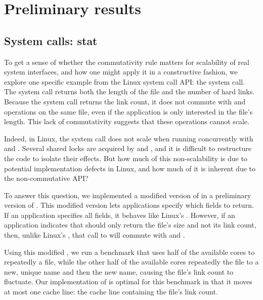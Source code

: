 \section{Preliminary results}
\label{s:prelim}



\subsection{System calls: stat}


To get a sense of whether the commutativity rule matters for scalability
of real system interfaces, and how one might apply it in a constructive
fashion, we explore one specific example from the Linux system call API:
the  system call.  The  system call returns both the
length of the file and the number of hard links.  Because the 
system call returns the link count, it does not commute with
 and  operations on the same file, even if
the application is only interested in the file's length. This lack of
commutativity suggests that these operations cannot scale.

Indeed, in Linux, the  system call does not scale when running
concurrently with  and .
Several shared locks are acquired by  and , and
it is difficult to restructure the code to isolate their effects.  But
how much of this non-scalability is due to potential implementation
defects in Linux, and how much of it is inherent due to the non-commutative
API?

To answer this question, we implemented a modified version of
 in a preliminary version of \sys.  This
modified version lets applications specify which fields to return.  If
an application specifies all fields, it behaves like Linux's
.  However, if an application indicates that 
should only return the file's size and not its link count, then,
unlike Linux's , that call to  will commute with
 and .

Using this modified , we run a benchmark that uses half of
the available cores to repeatedly  a file, while the other
half of the available cores repeatedly  the file to a new,
unique name and then  the new name, causing the file's
link count to fluctuate.  Our implementation of  is optimal
for this benchmark in that it moves at most one cache line: the cache
line containing the file's link count.

